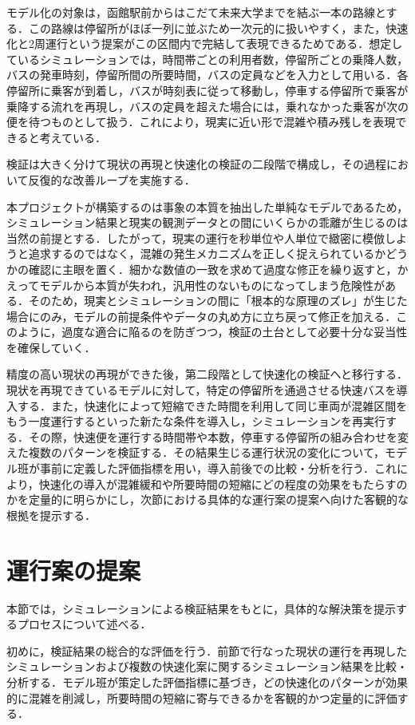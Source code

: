 モデル化の対象は，函館駅前からはこだて未来大学までを結ぶ一本の路線とする．この路線は停留所がほぼ一列に並ぶため一次元的に扱いやすく，また，快速化と2周運行という提案がこの区間内で完結して表現できるためである．想定しているシミュレーションでは，時間帯ごとの利用者数，停留所ごとの乗降人数，バスの発車時刻，停留所間の所要時間，バスの定員などを入力として用いる．各停留所に乗客が到着し，バスが時刻表に従って移動し，停車する停留所で乗客が乗降する流れを再現し，バスの定員を超えた場合には，乗れなかった乗客が次の便を待つものとして扱う．これにより，現実に近い形で混雑や積み残しを表現できると考えている．

検証は大きく分けて現状の再現と快速化の検証の二段階で構成し，その過程において反復的な改善ループを実施する．

本プロジェクトが構築するのは事象の本質を抽出した単純なモデルであるため，シミュレーション結果と現実の観測データとの間にいくらかの乖離が生じるのは当然の前提とする．したがって，現実の運行を秒単位や人単位で緻密に模倣しようと追求するのではなく，混雑の発生メカニズムを正しく捉えられているかどうかの確認に主眼を置く．細かな数値の一致を求めて過度な修正を繰り返すと，かえってモデルから本質が失われ，汎用性のないものになってしまう危険性がある．そのため，現実とシミュレーションの間に「根本的な原理のズレ」が生じた場合にのみ，モデルの前提条件やデータの丸め方に立ち戻って修正を加える．このように，過度な適合に陥るのを防ぎつつ，検証の土台として必要十分な妥当性を確保していく．

精度の高い現状の再現ができた後，第二段階として快速化の検証へと移行する．現状を再現できているモデルに対して，特定の停留所を通過させる快速バスを導入する．また，快速化によって短縮できた時間を利用して同じ車両が混雑区間をもう一度運行するといった新たな条件を導入し，シミュレーションを再実行する．その際，快速便を運行する時間帯や本数，停車する停留所の組み合わせを変えた複数のパターンを検証する．その結果生じる運行状況の変化について，モデル班が事前に定義した評価指標を用い，導入前後での比較・分析を行う．これにより，快速化の導入が混雑緩和や所要時間の短縮にどの程度の効果をもたらすのかを定量的に明らかにし，次節における具体的な運行案の提案へ向けた客観的な根拠を提示する．

\section{運行案の提案}
本節では，シミュレーションによる検証結果をもとに，具体的な解決策を提示するプロセスについて述べる．

初めに，検証結果の総合的な評価を行う．前節で行なった現状の運行を再現したシミュレーションおよび複数の快速化案に関するシミュレーション結果を比較・分析する．モデル班が策定した評価指標に基づき，どの快速化のパターンが効果的に混雑を削減し，所要時間の短縮に寄与できるかを客観的かつ定量的に評価する．

